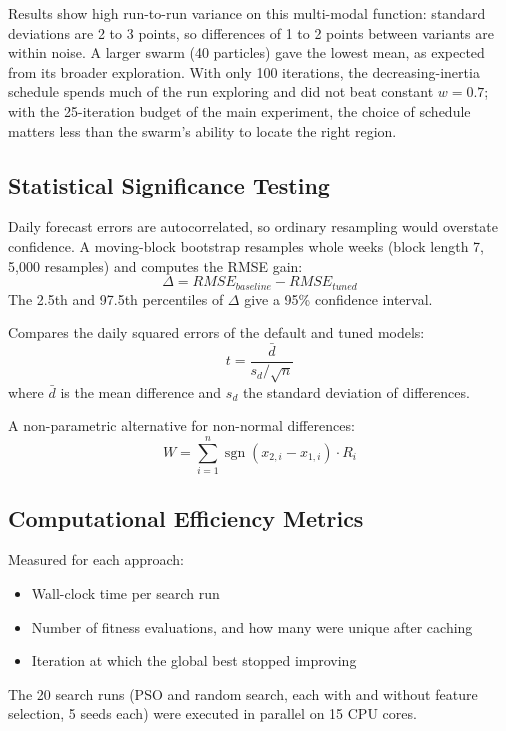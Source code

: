 Results show high run-to-run variance on this multi-modal function: standard deviations are 2 to 3 points, so differences of 1 to 2 points between variants are within noise. A larger swarm (40 particles) gave the lowest mean, as expected from its broader exploration. With only 100 iterations, the decreasing-inertia schedule spends much of the run exploring and did not beat constant $w = 0.7$; with the 25-iteration budget of the main experiment, the choice of schedule matters less than the swarm's ability to locate the right region.

\subsection{Statistical Significance Testing}

Daily forecast errors are autocorrelated, so ordinary resampling would overstate confidence. A moving-block bootstrap \cite{kunsch1989} resamples whole weeks (block length 7, 5,000 resamples) and computes the RMSE gain:
\begin{equation}
\Delta = RMSE_{baseline} - RMSE_{tuned}
\end{equation}
The 2.5th and 97.5th percentiles of $\Delta$ give a 95\% confidence interval.

Compares the daily squared errors of the default and tuned models:
\begin{equation}
t = \frac{\bar{d}}{s_d / \sqrt{n}}
\end{equation}
where $\bar{d}$ is the mean difference and $s_d$ the standard deviation of differences.

A non-parametric alternative for non-normal differences:
\begin{equation}
W = \sum_{i=1}^{n} \operatorname{sgn}(x_{2,i} - x_{1,i}) \cdot R_i
\end{equation}

\subsection{Computational Efficiency Metrics}

Measured for each approach:
\begin{itemize}
\item Wall-clock time per search run
\item Number of fitness evaluations, and how many were unique after caching
\item Iteration at which the global best stopped improving
\end{itemize}
The 20 search runs (PSO and random search, each with and without feature selection, 5 seeds each) were executed in parallel on 15 CPU cores.

